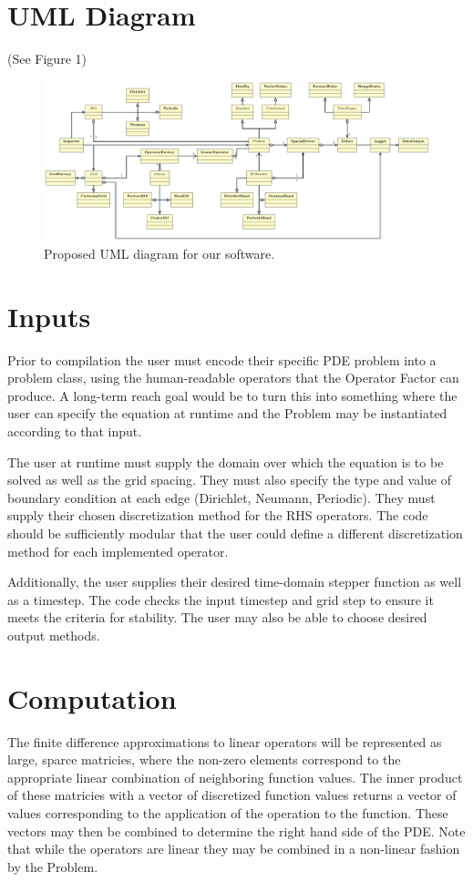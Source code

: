 \documentclass{article}
\begin{document}
	\section{UML Diagram}
		(See Figure 1)
		\begin{figure}[h!]
			\centering
			\includegraphics[angle=90,origin=c,width = .5\linewidth]{uml.pdf}
			\caption{Proposed UML diagram for our software.}
		\end{figure}	

	\section{Inputs}
		Prior to compilation the user must encode their specific PDE problem into a problem class, using the human-readable operators that the Operator Factor can produce. A long-term reach goal would be to turn this into something where the user can specify the equation at runtime and the Problem may be instantiated according to that input. 

		The user at runtime must supply the domain over which the equation is to be solved as well as the grid spacing. They must also specify the type and value of boundary condition at each edge (Dirichlet, Neumann, Periodic). They must supply their chosen discretization method for the RHS operators. The code should be sufficiently modular that the user could define a different discretization method for each implemented operator. 

		Additionally, the user supplies their desired time-domain stepper function as well as a timestep. The code checks the input timestep and grid step to ensure it meets the criteria for stability. The user may also be able to choose desired output methods. 

	\section{Computation}
		The finite difference approximations to linear operators will be represented as large, sparce matricies, where the non-zero elements correspond to the appropriate linear combination of neighboring function values. The inner product of these matricies with a vector of discretized function values returns a vector of values corresponding to the application of the operation to the function. These vectors may then be combined to determine the right hand side of the PDE. Note that while the operators are linear they may be combined in a non-linear fashion by the Problem.
\end{document}
